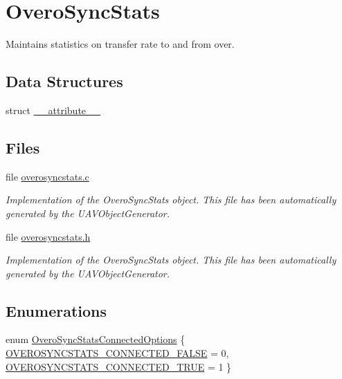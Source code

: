 \hypertarget{group___overo_sync_stats}{\section{\-Overo\-Sync\-Stats}
\label{group___overo_sync_stats}
}


\-Maintains statistics on transfer rate to and from over.  


\subsection*{\-Data \-Structures}
\begin{DoxyCompactItemize}
\item 
struct \hyperlink{struct____attribute____}{\-\_\-\-\_\-attribute\-\_\-\-\_\-}
\end{DoxyCompactItemize}
\subsection*{\-Files}
\begin{DoxyCompactItemize}
\item 
file \hyperlink{overosyncstats_8c}{overosyncstats.\-c}
\begin{DoxyCompactList}\small\item\em \-Implementation of the \-Overo\-Sync\-Stats object. \-This file has been automatically generated by the \-U\-A\-V\-Object\-Generator. \end{DoxyCompactList}\item 
file \hyperlink{overosyncstats_8h}{overosyncstats.\-h}
\begin{DoxyCompactList}\small\item\em \-Implementation of the \-Overo\-Sync\-Stats object. \-This file has been automatically generated by the \-U\-A\-V\-Object\-Generator. \end{DoxyCompactList}\end{DoxyCompactItemize}
\subsection*{\-Enumerations}
\begin{DoxyCompactItemize}
\item 
enum \hyperlink{group___overo_sync_stats_ga8608b489007b08495c506061a9532b64}{\-Overo\-Sync\-Stats\-Connected\-Options} \{ \hyperlink{group___overo_sync_stats_gga8608b489007b08495c506061a9532b64ac4d2b530775847804bdb32f097540c7b}{\-O\-V\-E\-R\-O\-S\-Y\-N\-C\-S\-T\-A\-T\-S\-\_\-\-C\-O\-N\-N\-E\-C\-T\-E\-D\-\_\-\-F\-A\-L\-S\-E} = 0, 
\hyperlink{group___overo_sync_stats_gga8608b489007b08495c506061a9532b64ab1455438747dea3023d5fe8c5d6a5c49}{\-O\-V\-E\-R\-O\-S\-Y\-N\-C\-S\-T\-A\-T\-S\-\_\-\-C\-O\-N\-N\-E\-C\-T\-E\-D\-\_\-\-T\-R\-U\-E} = 1
 \}
\end{DoxyCompactItemize}
